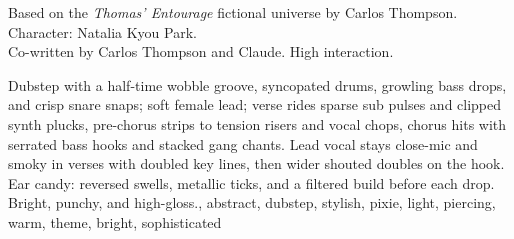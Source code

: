 

\begin{notes}
Based on the \emph{Thomas’ Entourage} fictional universe by Carlos Thompson.\\
Character: Natalia Kyou Park.\\
Co-written by Carlos Thompson and Claude. %
High interaction.
\end{notes}

\begin{style}
Dubstep with a half-time wobble groove, syncopated drums, growling bass drops, and crisp snare snaps; soft female lead; verse rides sparse sub pulses and clipped synth plucks, pre-chorus strips to tension risers and vocal chops, chorus hits with serrated bass hooks and stacked gang chants. %
Lead vocal stays close-mic and smoky in verses with doubled key lines, then wider shouted doubles on the hook. %
Ear candy: reversed swells, metallic ticks, and a filtered build before each drop. %
Bright, punchy, and high-gloss., abstract, dubstep, stylish, pixie, light, piercing, warm, theme, bright, sophisticated
\end{style}

